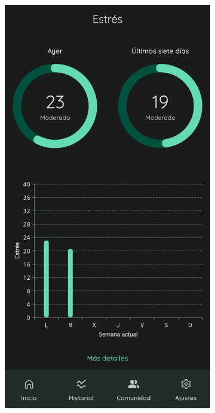                 \begin{figure}[htbp]
                	\centering
                	\begin{subfigure}[c]{0.4\textwidth}
                		\centering
                		\includegraphics[width=1\textwidth]{figures/pantallas/Medida.png}

\end{subfigure}
\end{figure}
